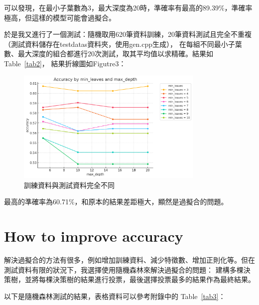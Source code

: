 \documentclass[11pt,a4paper]{extarticle}
\begin{document}
    可以發現，在最小子葉數為3，最大深度為20時，準確率有最高的89.39\%，準確率極高，但這樣的模型可能會過擬合。

    於是我又進行了一個測試：隨機取用620筆資料訓練，20筆資料測試且完全不重複（測試資料儲存在testdatas資料夾，使用gen.cpp生成），
    在每組不同最小子葉數、最大深度的組合都進行20次測試，取其平均值以求精確。結果如Table~\ref{tab2}，
    結果折線圖如Figutre3：
    \begin{figure}[H]
        \centering
        \includegraphics[width=0.8\textwidth]{src/picture2.png}
        \caption{訓練資料與測試資料完全不同}
    \end{figure}

    最高的準確率為60.71\%，和原本的結果差距極大，顯然是過擬合的問題。

    \newpage
    \section*{How to improve accuracy} 
    解決過擬合的方法有很多，例如增加訓練資料、減少特徵數、增加正則化等。但在測試資料有限的狀況下，我選擇使用隨機森林來解決過擬合的問題：
    建構多棵決策樹，並將每棵決策樹的結果進行投票，最後選擇投票最多的結果作為最終結果。

    以下是隨機森林測試的結果，表格資料可以參考附錄中的 Table~\ref{tab3}：
\end{document}
